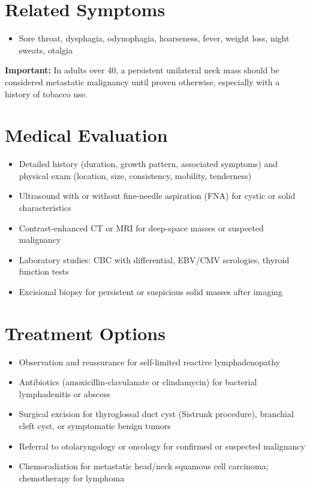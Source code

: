 \section*{Related Symptoms}
\begin{itemize}
  \item Sore throat, dysphagia, odynophagia, hoarseness, fever, weight loss, night sweats, otalgia
\end{itemize}
\textbf{Important:} In adults over 40, a persistent unilateral neck mass should be considered metastatic malignancy until proven otherwise, especially with a history of tobacco use.

\section*{Medical Evaluation}
\begin{itemize}
  \item Detailed history (duration, growth pattern, associated symptoms) and physical exam (location, size, consistency, mobility, tenderness)
  \item Ultrasound with or without fine-needle aspiration (FNA) for cystic or solid characteristics
  \item Contrast-enhanced CT or MRI for deep-space masses or suspected malignancy
  \item Laboratory studies: CBC with differential, EBV/CMV serologies, thyroid function tests
  \item Excisional biopsy for persistent or suspicious solid masses after imaging
\end{itemize}

\section*{Treatment Options}
\begin{itemize}
  \item Observation and reassurance for self-limited reactive lymphadenopathy
  \item Antibiotics (amoxicillin-clavulanate or clindamycin) for bacterial lymphadenitis or abscess
  \item Surgical excision for thyroglossal duct cyst (Sistrunk procedure), branchial cleft cyst, or symptomatic benign tumors
  \item Referral to otolaryngology or oncology for confirmed or suspected malignancy
  \item Chemoradiation for metastatic head/neck squamous cell carcinoma; chemotherapy for lymphoma
\end{itemize}

